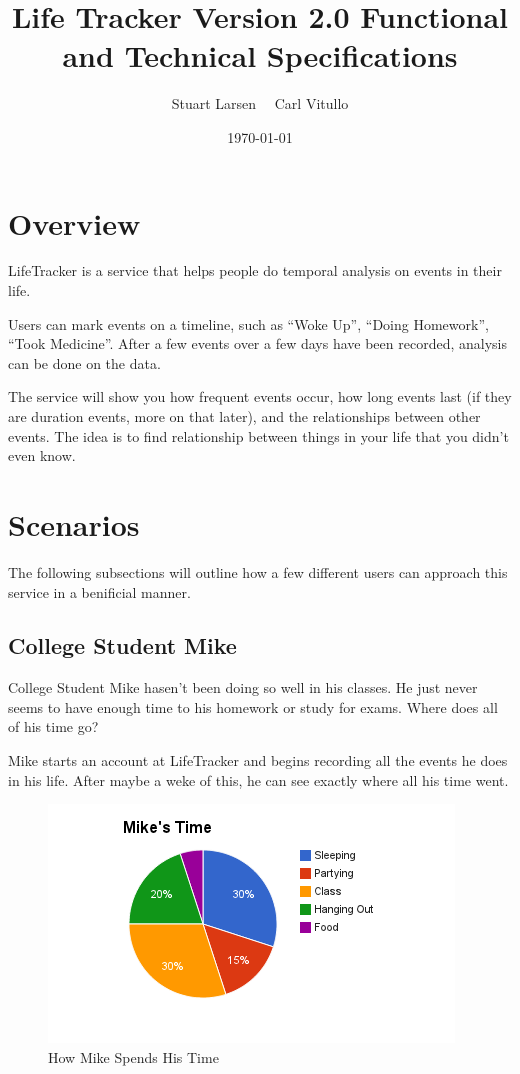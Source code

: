 \documentclass[12pt]{article}
\title{Life Tracker Version 2.0 Functional and Technical Specifications}
\author{Stuart Larsen \ \  Carl Vitullo}
\date{\today}
\begin{document}
\maketitle
\thispagestyle{empty}

\pagebreak
\thispagestyle{empty}
\tableofcontents
\thispagestyle{empty}
\clearpage

\section{Overview}

LifeTracker is a service that helps people do temporal analysis on events in their life.

Users can mark events on a timeline, such as ``Woke Up'', ``Doing Homework'', ``Took Medicine''. After a few events over a few days have been recorded, analysis can be done on the data.

The service will show you how frequent events occur, how long events last (if they are duration events, more on that later), and the relationships between other events. The idea is to find relationship between things in your life that you didn't even know.

\section{Scenarios}

The following subsections will outline how a few different users can approach this service in a benificial manner.

\subsection{College Student Mike}

College Student Mike hasen't been doing so well in his classes. He just never seems to have enough time to his homework or study for exams. Where does all of his time go?

Mike starts an account at LifeTracker and begins recording all the events he does in his life. After maybe a weke of this, he can see exactly where all his time went.

\begin{figure}[h!]
  \centering
  \includegraphics[scale=.9]{images/mikeChart}
  \caption{How Mike Spends His Time}
  \label{fig:mikeChart}
\end{figure}
\end{document}
